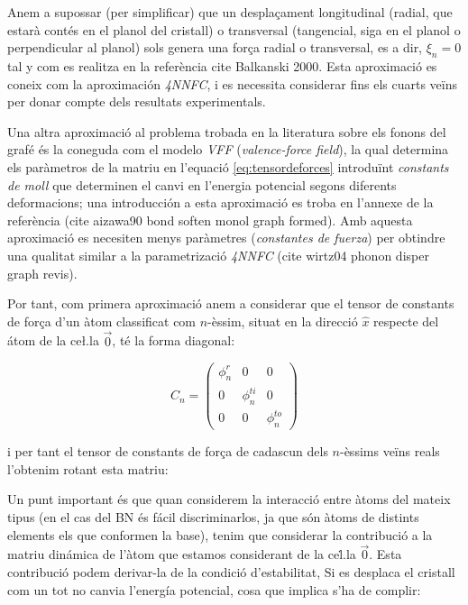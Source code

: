 \documentclass[12pt,twoside,a4paper, notitlepage]{article}%
\begin{document}
Anem a supossar (per simplificar) que un despla\c{c}ament longitudinal (radial, que estarà contés en el planol del cristall) o transversal (tangencial, siga en el planol o perpendicular al planol) sols genera una for\c{c}a radial o transversal, es a dir, $\xi_n=0$ tal y com es realitza en la referència cite Balkanski 2000. Esta aproximació es coneix com la aproximación \textit{4NNFC}, i es necessita considerar fins els cuarts veïns per donar compte dels resultats experimentals.





Una altra aproximació al problema trobada en la literatura sobre els fonons del grafé és la coneguda com el modelo \textit{VFF} (\textit{valence-force field}), la qual determina els paràmetros de la matriu en l'equació \ref{eq:tensordeforces} introduïnt \textit{constants de moll} que determinen el canvi en l'energia potencial segons diferents deformacions; una introducción a esta aproximació es troba en l'annexe de la referència (cite aizawa90 bond soften monol graph formed). Amb aquesta aproximació 
es necesiten menys paràmetres (\textit{constantes de fuerza}) per  obtindre una qualitat similar a la parametrizació \textit{4NNFC} (cite wirtz04 phonon disper graph revis).

Por tant, com primera aproximació anem a considerar que el tensor de constants de for\c{c}a  d'un àtom classificat com $n$-èssim, situat en la direcció $\hat x$ respecte del átom de la ce\l.la $\vec 0$, té la forma diagonal:

\begin{equation}
C_n=\begin{pmatrix}
\phi_n^r& 0 &0\\
0 & \phi_n^{ti} & 0 \\
0 & 0 & \phi_n^{to}
\end{pmatrix}
\end{equation}

i per tant el tensor de constants de for\c{c}a de cadascun dels $n$-èssims veïns reals l'obtenim rotant esta matriu:
\vspace{4cm}


Un punt important és que quan considerem la interacció entre àtoms del mateix tipus (en el cas del BN és fácil discriminarlos, ja que són àtoms de distints elements els que conformen la base), tenim que considerar la contribució a la matriu dinámica de l'àtom que estamos considerant de la ce\.l.la $\vec 0$. Esta contribució podem derivar-la de la condició d'estabilitat, \cite{falkovsky08_symmet_const_phonon_disper_graph}
\cite{wirtz04_phonon_disper_graph_revis}
Si es desplaca el cristall com un tot no canvia l'energía potencial, cosa que implica s'ha de complir:
\end{document}
